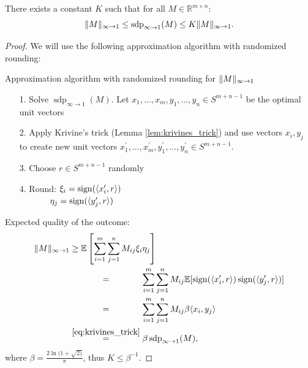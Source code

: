 	\begin{theo} \label{theo:G_ineq}
		There exists a constant $K$ such that for all $M\in\mathbb{R}^{m\times n}$:
		\begin{equation}
			 \Vert {M} \Vert_{\infty\to 1} \leq \operatorname{sdp}_{\infty\to 1} (M) \leq K  \Vert {M} \Vert_{\infty\to 1}.
		\end{equation}
	\end{theo}
	\begin{proof}
		We will use the following approximation algorithm with randomized rounding:
		
		\begin{algorithm}[H]
			\SetAlgoLined
			\caption{Approximation algorithm with randomized rounding for $ \Vert {M} \Vert_{\infty\to 1}$}
		\end{algorithm}
		\begin{itemize}
			\item[1.] Solve $\operatorname{sdp}_{\infty\to 1} (M)$. Let $x_1,\dots,x_m,y_1,\dots,y_n\in S^{m+n-1}$ be the optimal unit vectors
			\item[2.] Apply Krivine's trick (Lemma \ref{lem:krivines_trick}) and use vectors $x_i,y_j$ to create new unit vectors $x_1^\prime,\dots,x_m^\prime, y_1^\prime,\dots,y_n^\prime\in S^{m+n-1}$.
			\item[3.] Choose $r\in S^{m+n-1}$ randomly
			\item[4.] Round: $\xi_i = \operatorname{sign}(\langle{x_i^\prime},{r}\rangle)$\\
						\textcolor{white}{Round: }$\eta_j = \operatorname{sign}(\langle{y_j^\prime},{r}\rangle)$
		\end{itemize}
		
		\noindent Expected quality of the outcome:
		\begin{align*}
			\norm{M}_{\infty\to 1} &\geq \mathbb{E}\left[\sum_{i=1}^m\sum_{j=1}^n M_{ij}\xi_i\eta_j\right]\\
			&\overset{\textcolor{white}{\eqref*{eq:krivines_trick}}}{=} \sum_{i=1}^m\sum_{j=1}^n M_{ij} \mathbb{E}[\sgn(\sclr{x_i^\prime}{r}) \sgn(\sclr{y_j^\prime}{r})] \\
			&\overset{\textcolor{white}{\eqref*{eq:krivines_trick}}}{=}\sum_{i=1}^m\sum_{j=1}^n M_{ij}\beta \sclr{x_i}{y_j} \\
			&\overset{\eqref{eq:krivines_trick}}{=}\beta \operatorname{sdp}_{\infty\to 1}(M),
		\end{align*}
		where $\beta = \frac{2\ln(1+\sqrt{2)}}{\pi}$, thus $K\leq \beta^{-1}$.
	\end{proof}

